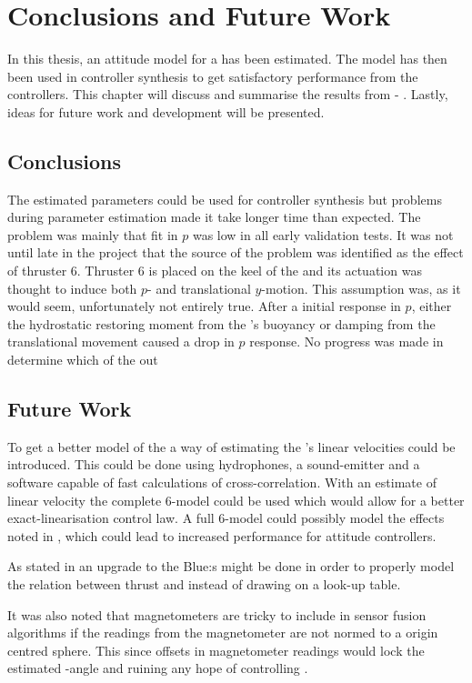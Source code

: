 \chapter{Conclusions and Future Work}\label{cha:conclusions}
In this thesis, an attitude model for a \abbrROV has been estimated. The model has then been used in controller synthesis to get satisfactory performance from the controllers. This chapter will discuss and summarise the results from  - . 
Lastly, ideas for future work and development will be presented.

\section{Conclusions}
The estimated parameters could be used for controller synthesis but problems during parameter estimation made it take longer time than expected. The problem was mainly that fit in $p$ was low in all early validation tests. It was not until late in the project that the source of the problem was identified as the effect of thruster 6. Thruster 6 is  placed on the keel of the \abbrROV and its actuation was thought to induce both $p$- and translational $y$-motion. This assumption was, as it would seem, unfortunately not entirely true. After a initial response in $p$, either the hydrostatic restoring moment from the \abbrROV's buoyancy or damping from the translational movement caused a drop in $p$ response. No progress was made in determine which of the  out     
\section{Future Work}
To get a better model of the \abbrROV a way of estimating the \abbrROV's linear velocities could be introduced. This could be done using hydrophones, a sound-emitter and a software capable of fast calculations of cross-correlation.
With an estimate of linear velocity the complete 6-\abbrDOF model could be used which would allow for a better exact-linearisation control law. A full 6-\abbrDOF model could possibly model the effects noted in , which could lead to increased performance for attitude controllers.

As stated in  an upgrade to the Blue\abbrESC:s might be done in order to properly model the relation between thrust and \abbrRPM instead of drawing on a look-up table.

It was also noted that magnetometers are tricky to include in sensor fusion algorithms if the readings from the magnetometer are not normed to a origin centred sphere. This since offsets in magnetometer readings would lock the estimated \psi-angle and ruining any hope of controlling \psi. 